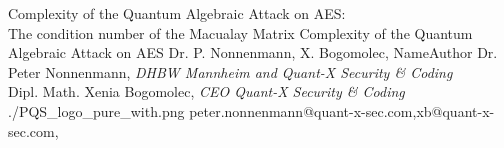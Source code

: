 \documentclass[a4paper,11pt]{article}
\begin{document}
\setcounter{footnote}{0}
\setcounter{figure}{0}



\Aufsatz 
{Complexity of the Quantum Algebraic Attack on AES:\\
The condition number of the Macualay Matrix}
{Complexity of the Quantum Algebraic Attack on AES}
{Dr. P. Nonnenmann, X. Bogomolec,}
{NameAuthor}
{Dr. Peter Nonnenmann,
{\small \textit{DHBW Mannheim and Quant-X Security {\&} Coding}} \\
Dipl. Math. Xenia Bogomolec, 
{\small \textit{CEO Quant-X Security {\&} Coding}} \\}
{./PQS_logo_pure_with.png}
{peter.nonnenmann@quant-x-sec.com,xb@quant-x-sec.com,}
\end{document}
